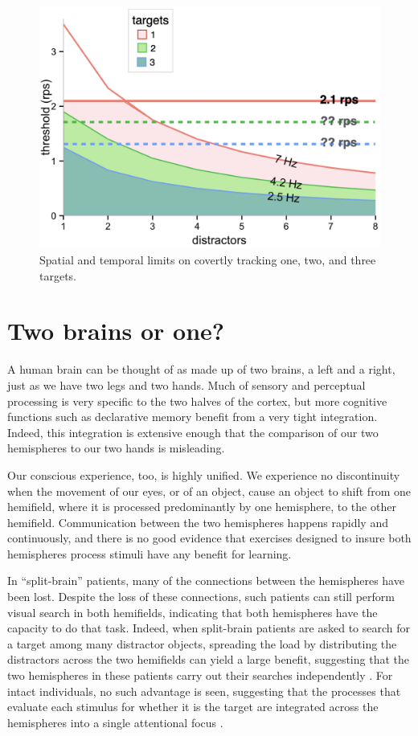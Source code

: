 \documentclass[
]{book}
\begin{document}
\begin{figure}
\includegraphics[width=1\linewidth]{imagesForRmd/temporalAndSpeedLimits} \caption{Spatial and temporal limits on covertly tracking one, two, and three targets. }\label{fig:unnamed-chunk-11}
\end{figure}

\hypertarget{twoBrains}{%
\chapter{Two brains or one?}\label{twoBrains}}

A human brain can be thought of as made up of two brains, a left and a right, just as we have two legs and two hands.
Much of sensory and perceptual processing is very specific to the two halves of the cortex, but more cognitive functions such as declarative memory benefit from a very tight integration. Indeed, this integration is extensive enough that the comparison of our two hemispheres to our two hands is misleading.

Our conscious experience, too, is highly unified. We experience no discontinuity when the movement of our eyes, or of an object, cause an object to shift from one hemifield, where it is processed predominantly by one hemisphere, to the other hemifield. Communication between the two hemispheres happens rapidly and continuously, and there is no good evidence that exercises designed to insure both hemispheres process stimuli have any benefit for learning.

In ``split-brain'' patients, many of the connections between the hemispheres have been lost. Despite the loss of these connections, such patients can still perform visual search in both hemifields, indicating that both hemispheres have the capacity to do that task. Indeed, when split-brain patients are asked to search for a target among many distractor objects, spreading the load by distributing the distractors across the two hemifields can yield a large benefit, suggesting that the two hemispheres in these patients carry out their searches independently \citep{luckIndependentAttentionalScanning1994a}. For intact individuals, no such advantage is seen, suggesting that the processes that evaluate each stimulus for whether it is the target are integrated across the hemispheres into a single attentional focus \citep{luckIndependentHemisphericAttentional1989}.
\end{document}
